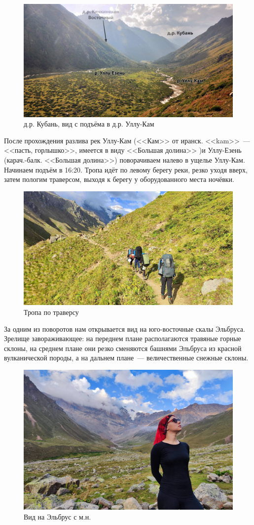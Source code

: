 \begin{figure}[h!]
	\centering
	\includegraphics[width=0.7\linewidth]{../pics/DSC_0464 2.JPG}
	\caption{д.р. Кубань, вид с подъёма в д.р. Уллу-Кам}
	\label{fig:DSC_0464 2.JPG}
\end{figure}

После прохождения разлива рек Уллу-Кам (<<Кам>> от иранск. <<kam>>~---<<пасть, горлышко>>, имеется в виду <<Большая долина>> \cite{proza})и Уллу-Езень (карач.-балк. <<Большая долина>>) поворачиваем налево в ущелье Уллу-Кам. Начинаем подъём в 16:20. Тропа идёт по левому берегу реки, резко уходя вверх, затем пологим траверсом, выходя к берегу у оборудованного места ночёвки.


\begin{figure}[h!]
	\centering
	\includegraphics[width=0.7\linewidth]{../pics/IMG_20240829_170756.jpg}
	\caption{Тропа по траверсу}
	\label{fig:IMG_20240829_170756.jpg}
\end{figure}

За одним из поворотов нам открывается вид на юго-восточные скалы Эльбруса. Зрелище завораживающее: на переднем плане располагаются травяные горные склоны, на среднем плане они резко сменяются башнями Эльбруса из красной вулканической породы, а на дальнем плане~--- величественные снежные склоны.

\begin{figure}[h!]
	\centering
	\includegraphics[width=0.7\linewidth]{../pics/IMG_20240829_181353.jpg}
	\caption{Вид на Эльбрус с м.н.}
	\label{fig:IMG_20240829_184033}
\end{figure}


